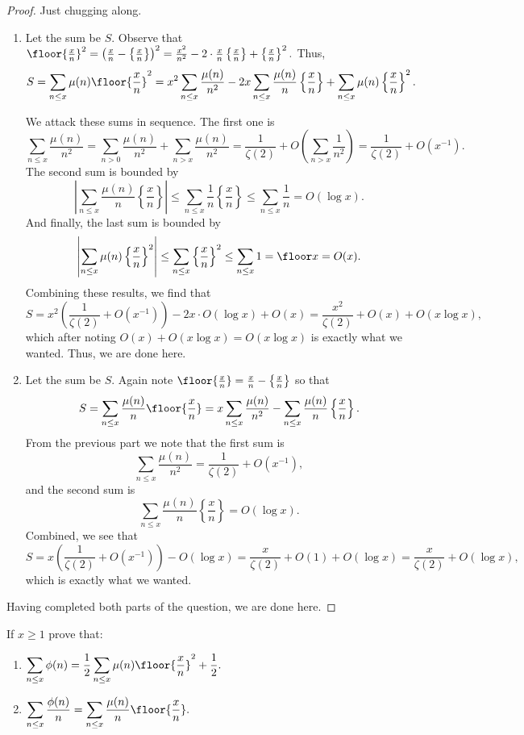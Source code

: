 \begin{proof}
Just chugging along.
\begin{enumerate}[label=(\alph*)]
    \item Let the sum be $S.$ Observe that $\floor{\frac xn}^2=\left(\frac xn-\left\{\frac xn\right\}\right)^2=\frac{x^2}{n^2}-2\cdot\frac xn\left\{\frac xn\right\}+\left\{\frac xn\right\}^2.$ Thus,
    \[S=\sum_{n\le x}\mu(n)\floor{\frac xn}^2=x^2\sum_{n\le x}\frac{\mu(n)}{n^2}-2x\sum_{n\le x}\frac{\mu(n)}n\left\{\frac xn\right\}+\sum_{n\le x}\mu(n)\left\{\frac xn\right\}^2.\]
    
    We attack these sums in sequence. The first one is
    \[\sum_{n\le x}\frac{\mu(n)}{n^2}=\sum_{n>0}\frac{\mu(n)}{n^2}+\sum_{n>x}\frac{\mu(n)}{n^2}=\frac1{\zeta(2)}+O\left(\sum_{n>x}\frac1{n^2}\right)=\frac1{\zeta(2)}+O\left(x^{-1}\right).\]
    The second sum is bounded by
    \[\left|\sum_{n\le x}\frac{\mu(n)}n\left\{\frac xn\right\}\right|\le\sum_{n\le x}\frac1n\left\{\frac xn\right\}\le\sum_{n\le x}\frac1n=O(\log x).\]
    And finally, the last sum is bounded by
    \[\left|\sum_{n\le x}\mu(n)\left\{\frac xn\right\}^2\right|\le\sum_{n\le x}\left\{\frac xn\right\}^2\le\sum_{n\le x}1=\floor x=O(x).\]
    Combining these results, we find that
    \[S=x^2\left(\frac1{\zeta(2)}+O\left(x^{-1}\right)\right)-2x\cdot O(\log x)+O(x)=\frac{x^2}{\zeta(2)}+O(x)+O(x\log x),\]
    which after noting $O(x)+O(x\log x)=O(x\log x)$ is exactly what we wanted. Thus, we are done here.
    \item Let the sum be $S.$ Again note $\floor{\frac xn}=\frac xn-\left\{\frac xn\right\}$ so that
    \[S=\sum_{n\le x}\frac{\mu(n)}n\floor{\frac xn}=x\sum_{n\le x}\frac{\mu(n)}{n^2}-\sum_{n\le x}\frac{\mu(n)}n\left\{\frac xn\right\}.\]
    From the previous part we note that the first sum is
    \[\sum_{n\le x}\frac{\mu(n)}{n^2}=\frac1{\zeta(2)}+O\left(x^{-1}\right),\]
    and the second sum is
    \[\sum_{n\le x}\frac{\mu(n)}n\left\{\frac xn\right\}=O(\log x).\]
    Combined, we see that
    \[S=x\left(\frac1{\zeta(2)}+O\left(x^{-1}\right)\right)-O(\log x)=\frac x{\zeta(2)}+O(1)+O(\log x)=\frac x{\zeta(2)}+O(\log x),\]
    which is exactly what we wanted.
\end{enumerate}
Having completed both parts of the question, we are done here.
\end{proof}

\begin{exercise}
If $x\ge1$ prove that:
\begin{enumerate}[label=(\alph*)]
    \item$\displaystyle\sum_{n\le x}\phi(n)=\frac12\sum_{n\le x}\mu(n)\floor{\frac xn}^2+\frac12.$
    \item$\displaystyle\sum_{n\le x}\frac{\phi(n)}n=\sum_{n\le x}\frac{\mu(n)}n\floor{\frac xn}.$
\end{enumerate}
\end{exercise}

